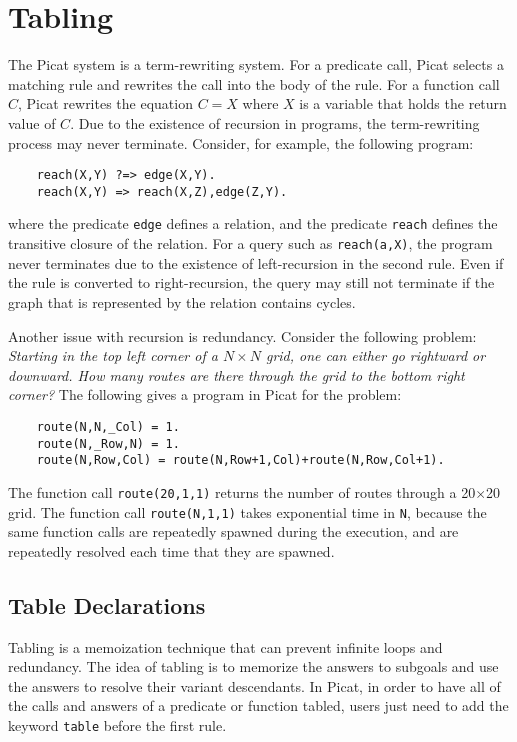 \chapter{\label{chapter:tabling}Tabling}
The Picat system is a term-rewriting system. For a predicate call, Picat selects a matching rule and rewrites the call into the body of the rule. For a function call $C$, Picat rewrites the equation $C = X$ where $X$ is a variable that holds the return value of $C$. Due to the existence of recursion in programs, the term-rewriting process may never terminate. Consider, for example, the following program:  
\begin{verbatim}
    reach(X,Y) ?=> edge(X,Y).
    reach(X,Y) => reach(X,Z),edge(Z,Y).
\end{verbatim}
where the predicate \texttt{edge} defines a relation, and the predicate \texttt{reach} defines the transitive closure of the relation. For a query such as \texttt{reach(a,X)}, the program never terminates due to the existence of left-recursion in the second rule. Even if the rule is converted to right-recursion, the query may still not terminate if the graph that is represented by the relation contains cycles. 

Another issue with recursion is redundancy. Consider the following problem: \emph{Starting in the top left corner of a $N\times N$ grid, one can either go rightward or downward. How many routes are there through the grid to the bottom right corner?} The following gives a program in Picat for the problem:
\begin{verbatim}
    route(N,N,_Col) = 1.
    route(N,_Row,N) = 1.
    route(N,Row,Col) = route(N,Row+1,Col)+route(N,Row,Col+1).
\end{verbatim}
The function call \texttt{route(20,1,1)} returns the number of routes through a 20$\times$20 grid. The function call \texttt{route(N,1,1)} takes exponential time in \texttt{N}, because the same function calls are repeatedly spawned during the execution, and are repeatedly resolved each time that they are spawned.

\section{Table Declarations}
Tabling is a memoization technique that can prevent infinite loops and redundancy. The idea of tabling is to memorize the answers to subgoals and use the answers to resolve their variant descendants. In Picat, in order to have all of the calls and answers of a predicate or function tabled, users just need to add the keyword \texttt{table} before the first rule.

